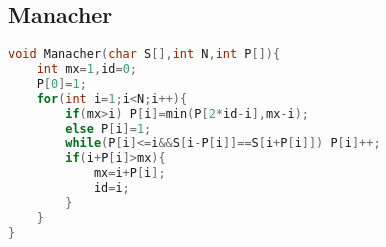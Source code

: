 \subsection{Manacher}
\begin{lstlisting}[language=C]
void Manacher(char S[],int N,int P[]){
	int mx=1,id=0;
	P[0]=1;
	for(int i=1;i<N;i++){
		if(mx>i) P[i]=min(P[2*id-i],mx-i);
		else P[i]=1;
		while(P[i]<=i&&S[i-P[i]]==S[i+P[i]]) P[i]++;
		if(i+P[i]>mx){
			mx=i+P[i];
			id=i;
		}
	}
}
\end{lstlisting}
